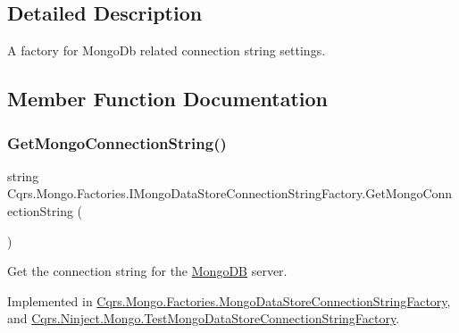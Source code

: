 \subsection{Detailed Description}
A factory for Mongo\+Db related connection string settings. 



\subsection{Member Function Documentation}
\mbox{\label{interfaceCqrs_1_1Mongo_1_1Factories_1_1IMongoDataStoreConnectionStringFactory_ad8ea94d071ebedf6b137a0b99c2cc12c_ad8ea94d071ebedf6b137a0b99c2cc12c}} 
\subsubsection{\texorpdfstring{Get\+Mongo\+Connection\+String()}{GetMongoConnectionString()}}
{\footnotesize\ttfamily string Cqrs.\+Mongo.\+Factories.\+I\+Mongo\+Data\+Store\+Connection\+String\+Factory.\+Get\+Mongo\+Connection\+String (\begin{DoxyParamCaption}{ }\end{DoxyParamCaption})}



Get the connection string for the \hyperlink{namespaceCqrs_1_1MongoDB}{Mongo\+DB} server. 



Implemented in \hyperlink{classCqrs_1_1Mongo_1_1Factories_1_1MongoDataStoreConnectionStringFactory_a33064b1b1cbf06ef4f9e12371c7ef785_a33064b1b1cbf06ef4f9e12371c7ef785}{Cqrs.\+Mongo.\+Factories.\+Mongo\+Data\+Store\+Connection\+String\+Factory}, and \hyperlink{classCqrs_1_1Ninject_1_1Mongo_1_1TestMongoDataStoreConnectionStringFactory_ae23b67139698984823fa7c250dcca47a_ae23b67139698984823fa7c250dcca47a}{Cqrs.\+Ninject.\+Mongo.\+Test\+Mongo\+Data\+Store\+Connection\+String\+Factory}.

